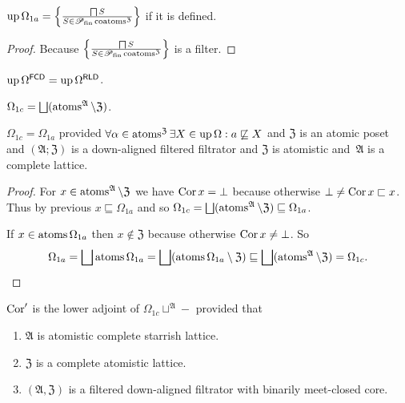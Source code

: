 \begin{prop}
  $\operatorname{up} \Omega_{1a} = \left\{ \frac{ \bigsqcap S }{ S \in
  \mathscr{P}_{\operatorname{fin}} \operatorname{coatoms}^{\mathfrak{Z}} }\right\}$
  if it is defined.
\end{prop}

\begin{proof}
  Because $\left\{ \frac{ \bigsqcap S }{ S \in
  \mathscr{P}_{\operatorname{fin}} \operatorname{coatoms}^{\mathfrak{Z}} }\right\}$ is a
  filter.
\end{proof}

\begin{cor}
  $\operatorname{up} \Omega^{\mathsf{FCD}} = \operatorname{up}
  \Omega^{\mathsf{RLD}}$.
\end{cor}

\begin{defn}
$\Omega_{1c} =
\bigsqcup(\atoms^{\mathfrak{A}}\setminus\mathfrak{Z})$.
\end{defn}

\begin{prop}
$\Omega_{1c} = \Omega_{1a}$ provided
  $\forall \alpha \in \operatorname{atoms}^{\mathfrak{Z}} \exists X \in \operatorname{up}
  \Omega : a \not\sqsubseteq X$ and $\mathfrak{Z}$ is an atomic
  poset and $(\mathfrak{A}; \mathfrak{Z})$ is a down-aligned
  filtered filtrator and $\mathfrak{Z}$ is atomistic and~$\mathfrak{A}$
  is a complete lattice.
\end{prop}

\begin{proof}
For $x\in\operatorname{atoms}^{\mathfrak{A}}\setminus\mathfrak{Z}$ we have
$\operatorname{Cor} x=\bot$ because otherwise $\bot\ne\operatorname{Cor} x\sqsubset x$.
Thus by previous $x\sqsubseteq\Omega_{1a}$ and so
$\Omega_{1c} =
\bigsqcup(\atoms^{\mathfrak{A}}\setminus\mathfrak{Z}) \sqsubseteq
\Omega_{1a}$.

If $x\in\operatorname{atoms}\Omega_{1a}$ then $x\notin\mathfrak{Z}$ because otherwise
$\operatorname{Cor} x\ne\bot$. So \[ \Omega_{1a}=\bigsqcup\atoms \Omega_{1a}=
\bigsqcup(\atoms \Omega_{1a}\setminus\mathfrak{Z})\sqsubseteq
\bigsqcup(\atoms^{\mathfrak{A}}\setminus\mathfrak{Z}) =
\Omega_{1c}. \]
\end{proof}

\begin{thm}
$\operatorname{Cor}'$ is the lower adjoint of
$\Omega_{1c}\sqcup^{\mathfrak{A}}-$
provided that
  \begin{enumerate}
    \item $\mathfrak{A}$ is atomistic complete starrish lattice.
    \item $\mathfrak{Z}$ is a complete atomistic lattice.
    \item $(\mathfrak{A},\mathfrak{Z})$ is a filtered
      down-aligned filtrator with binarily meet-closed core.
  \end{enumerate}
\end{thm}

